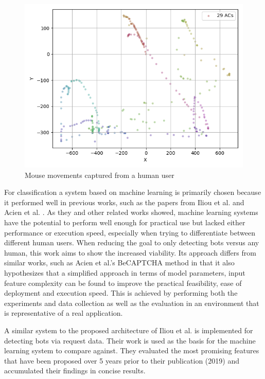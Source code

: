 \documentclass[
    fontsize=12pt,
    headings=small,
    parskip=half,           %
    bibliography=totoc,
    numbers=noenddot,       %
    open=any,               %
    final,                   %
    table
]{scrreprt}
\begin{document}
\begin{figure}[H]
    \includegraphics[width=\textwidth]{figures/user_mouse_heatmap.png}
    \caption{Mouse movements captured from a human user}
    \label{fig:user_mouse_heatmap}
\end{figure}

For classification a system based on machine learning is primarily chosen because it performed well in previous works, such as the papers from Iliou et al. \cite{10.1145/3339252.3339267} and Acien et al. \cite{Acien2020BeCAPTCHAMouseSM}. As they and other related works showed, machine learning systems have the potential to perform well enough for practical use but lacked either performance or execution speed, especially when trying to differentiate between different human users. When reducing the goal to only detecting bots versus any human, this work aims to show the increased viability. Its approach differs from similar works, such as Acien et al.'s BeCAPTCHA method \cite{Acien2020BeCAPTCHAMouseSM} in that it also hypothesizes that a simplified approach in terms of model parameters, input feature complexity can be found to improve the practical feasibility, ease of deployment and execution speed. This is achieved by performing both the experiments and data collection as well as the evaluation in an environment that is representative of a real application.

A similar system to the proposed architecture of Iliou et al. \cite{10.1145/3339252.3339267} is implemented for detecting bots via request data. Their work is used as the basis for the machine learning system to compare against. They evaluated the most promising features that have been proposed over 5 years prior to their publication (2019) and accumulated their findings in concise results.
\end{document}
